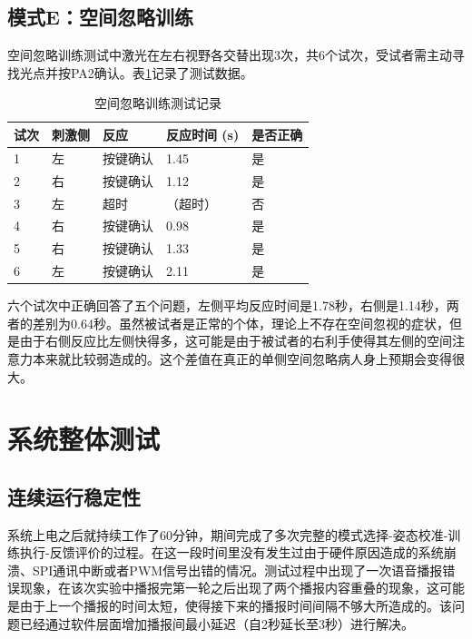 \subsection{模式E：空间忽略训练}

空间忽略训练测试中激光在左右视野各交替出现3次，共6个试次，受试者需主动寻找光点并按PA2确认。表\ref{tab:neglect_test}记录了测试数据。

\begin{table}[h!]
\centering
\caption{空间忽略训练测试记录}
\label{tab:neglect_test}
\begin{tabular}{p{2cm} p{2cm} p{2cm} p{3cm} p{2cm}}
\toprule[1.5pt]
\textbf{试次} & \textbf{刺激侧} & \textbf{反应} & \textbf{反应时间 (s)} & \textbf{是否正确} \\
\midrule[1pt]
1 & 左 & 按键确认 & 1.45  & 是 \\
2 & 右 & 按键确认 & 1.12  & 是 \\
3 & 左 & 超时     & （超时） & 否 \\
4 & 右 & 按键确认 & 0.98  & 是 \\
5 & 右 & 按键确认 & 1.33  & 是 \\
6 & 左 & 按键确认 & 2.11  & 是 \\
\bottomrule[1.5pt]
\end{tabular}
\end{table}

六个试次中正确回答了五个问题，左侧平均反应时间是1.78秒，右侧是1.14秒，两者的差别为0.64秒。虽然被试者是正常的个体，理论上不存在空间忽视的症状，但是由于右侧反应比左侧快得多，这可能是由于被试者的右利手使得其左侧的空间注意力本来就比较弱造成的。这个差值在真正的单侧空间忽略病人身上预期会变得很大。

\section{系统整体测试}

\subsection{连续运行稳定性}

系统上电之后就持续工作了60分钟，期间完成了多次完整的模式选择-姿态校准-训练执行-反馈评价的过程。在这一段时间里没有发生过由于硬件原因造成的系统崩溃、SPI通讯中断或者PWM信号出错的情况。测试过程中出现了一次语音播报错误现象，在该次实验中播报完第一轮之后出现了两个播报内容重叠的现象，这可能是由于上一个播报的时间太短，使得接下来的播报时间间隔不够大所造成的。该问题已经通过软件层面增加播报间最小延迟（自2秒延长至3秒）进行解决。

